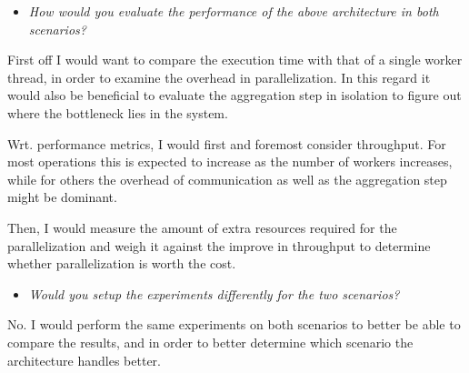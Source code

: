 \begin{itemize}
  \item  \textit{How would you evaluate the performance of the above
    architecture in both scenarios?}
\end{itemize}

First off I would want to compare the execution time with that of a single
worker thread, in order to examine the overhead in parallelization. In this
regard it would also be beneficial to evaluate the aggregation step in isolation
to figure out where the bottleneck lies in the system.
\medskip

Wrt. performance metrics, I would first and foremost consider throughput. For
most operations this is expected to increase as the number of workers increases,
while for others the overhead of communication as well as the aggregation step
might be dominant.
\medskip

Then, I would measure the amount of extra resources required for the
parallelization and weigh it against the improve in throughput to determine
whether parallelization is worth the cost.

\begin{itemize}
  \item \textit{Would you setup the experiments differently for the two
    scenarios?}
\end{itemize}

No. I would perform the same experiments on both scenarios to better be able to
compare the results, and in order to better determine which scenario the
architecture handles better.

\Sectend
